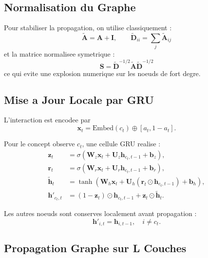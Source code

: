 \documentclass[11pt, a4paper]{article}
\begin{document}
\subsection{Normalisation du Graphe}

Pour stabiliser la propagation, on utilise classiquement :
\begin{equation}
    \tilde{\mathbf{A}} = \mathbf{A} + \mathbf{I}, \qquad
    \tilde{\mathbf{D}}_{ii} = \sum_j \tilde{\mathbf{A}}_{ij}
\end{equation}
et la matrice normalisee symetrique :
\begin{equation}
    \mathbf{S} = \tilde{\mathbf{D}}^{-1/2}\tilde{\mathbf{A}}\tilde{\mathbf{D}}^{-1/2}
\end{equation}
ce qui evite une explosion numerique sur les noeuds de fort degre.

\subsection{Mise a Jour Locale par GRU}

L'interaction est encodee par
\begin{equation}
    \mathbf{x}_t = \mathrm{Embed}(c_t) \oplus [a_t, 1-a_t].
\end{equation}

Pour le concept observe $c_t$, une cellule GRU realise :
\begin{align}
    \mathbf{z}_t         & = \sigma(\mathbf{W}_z\mathbf{x}_t + \mathbf{U}_z\mathbf{h}_{c_t,t-1} + \mathbf{b}_z),                     \\
    \mathbf{r}_t         & = \sigma(\mathbf{W}_r\mathbf{x}_t + \mathbf{U}_r\mathbf{h}_{c_t,t-1} + \mathbf{b}_r),                     \\
    \tilde{\mathbf{h}}_t & = \tanh(\mathbf{W}_h\mathbf{x}_t + \mathbf{U}_h(\mathbf{r}_t \odot \mathbf{h}_{c_t,t-1}) + \mathbf{b}_h), \\
    \mathbf{h}'_{c_t,t}  & = (1-\mathbf{z}_t) \odot \mathbf{h}_{c_t,t-1} + \mathbf{z}_t \odot \tilde{\mathbf{h}}_t.
\end{align}

Les autres noeuds sont conserves localement avant propagation :
\begin{equation}
    \mathbf{h}'_{i,t} = \mathbf{h}_{i,t-1}, \quad i \neq c_t.
\end{equation}

\subsection{Propagation Graphe sur L Couches}
\end{document}
